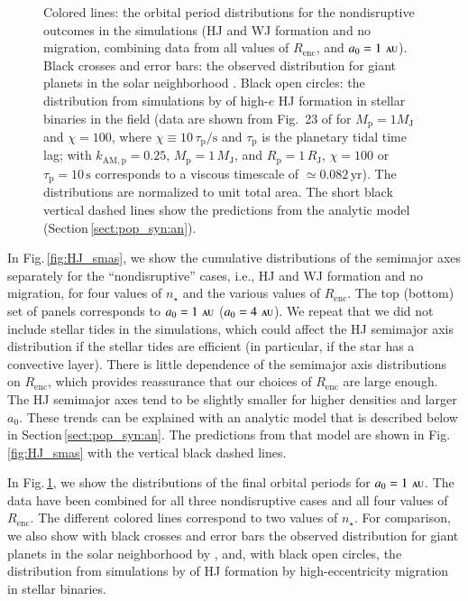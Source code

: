 \documentclass[iop,usenatbib]{emulateapj}
\renewcommand{\S}{Section}
\newcommand{\F}{Fig.}
\newcommand{\au}{\,\textsc{au}}
\newcommand{\renc}{R_\mathrm{enc}}
\begin{document}
\begin{figure}
\center
\iftoggle{ApJFigs}{
\texttt{[image: HJ\_periods\_obs\_run05.eps]}
}{
\texttt{[image: figs/HJ\_periods\_obs\_run05.eps]}
}
\caption { Colored lines: the orbital period distributions for the nondisruptive outcomes in the simulations (HJ and WJ formation and no migration, combining data from all values of $\renc$, and $a_0=1\,\au$). Black crosses and error bars: the observed distribution for giant planets in the solar neighborhood \citep{2016A&A...587A..64S}. Black open circles: the distribution from simulations by \citet{2016MNRAS.456.3671A} of high-$e$ HJ formation in stellar binaries in the field (data are shown from Fig.~23 of \citealt{2016MNRAS.456.3671A} for $M_\mathrm{p} = 1 M_\mathrm{J}$ and $\chi = 100$, where $\chi \equiv 10 \, \tau_\mathrm{p}/\mathrm{s}$ and $\tau_\mathrm{p}$ is the planetary tidal time lag; with $k_\mathrm{AM,\mathrm{p}} = 0.25$, $M_\mathrm{p} = 1\,M_\mathrm{J}$, and $R_\mathrm{p} = 1 \, R_\mathrm{J}$, $\chi=100$ or $\tau_\mathrm{p} = 10 \, \mathrm{s}$ corresponds to a viscous timescale of $\simeq 0.082 \, \mathrm{yr}$). The distributions are normalized to unit total area. The short black vertical dashed lines show the predictions from the analytic model (\S\,\ref{sect:pop_syn:an}).}
\label{fig:HJ_periods_obs}
\end{figure}

In \F\,\ref{fig:HJ_smas}, we show the cumulative distributions of the semimajor axes separately for the ``nondisruptive'' cases, i.e., HJ and WJ formation and no migration, for four values of $n_\star$ and the various values of $\renc$. The top (bottom) set of panels corresponds to $a_0=1\,\au$ ($a_0=4\,\au$). We repeat that we did not include stellar tides in the simulations, which could affect the HJ semimajor axis distribution if the stellar tides are efficient (in particular, if the star has a convective layer). There is little dependence of the semimajor axis distributions on $\renc$, which provides reassurance that our choices of $\renc$ are large enough. The HJ semimajor axes tend to be slightly smaller for higher densities and larger $a_0$. These trends can be explained with an analytic model that is described below in \S\,\ref{sect:pop_syn:an}. The predictions from that model are shown in \F\,\ref{fig:HJ_smas} with the vertical black dashed lines. 

In \F\,\ref{fig:HJ_periods_obs}, we show the distributions of the final orbital periods for $a_0=1\,\au$. The data have been combined for all three nondisruptive cases and all four values of $\renc$. The different colored lines correspond to two values of $n_\star$. For comparison, we also show with black crosses and error bars the observed distribution for giant planets in the solar neighborhood by \citet{2016A&A...587A..64S}, and, with black open circles, the distribution from simulations by \citet{2016MNRAS.456.3671A} of HJ formation by high-eccentricity migration in stellar binaries. 
\end{document}
